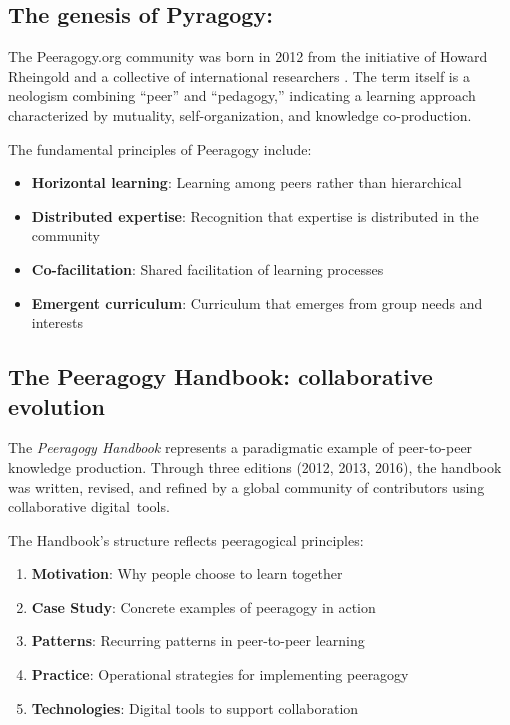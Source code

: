 \subsection*{The genesis of Pyragogy:}

The Peeragogy.org community was born in 2012 from the initiative of Howard Rheingold and a collective of international researchers \cite{Rheingold2012}. The term itself is a neologism combining ``peer'' and ``pedagogy,'' indicating a learning approach characterized by mutuality, self-organization, and knowledge co-production.

The fundamental principles of Peeragogy include:

\begin{itemize}
	\item \textbf{Horizontal learning}: Learning among peers rather than hierarchical
	\item \textbf{Distributed expertise}: Recognition that expertise is distributed in the community
	\item \textbf{Co-facilitation}: Shared facilitation of learning processes
	\item \textbf{Emergent curriculum}: Curriculum that emerges from group needs and interests
\end{itemize}

\subsection{The Peeragogy Handbook: collaborative evolution}

The \textit{Peeragogy Handbook} \cite{CorneliEtAl2016} represents a paradigmatic example of peer-to-peer knowledge production. Through three editions (2012, 2013, 2016), the handbook was written, revised, and refined by a global community of contributors using collaborative digital~tools.

The Handbook's structure reflects peeragogical principles:

\begin{enumerate}
	\item \textbf{Motivation}: Why people choose to learn together
	\item \textbf{Case Study}: Concrete examples of peeragogy in action
	\item \textbf{Patterns}: Recurring patterns in peer-to-peer learning  
	\item \textbf{Practice}: Operational strategies for implementing peeragogy
	\item \textbf{Technologies}: Digital tools to support collaboration
\end{enumerate}

